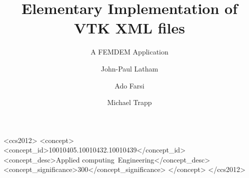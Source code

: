 \documentclass[format=acmtog,12pt,screen=true,review=false,natbib=false,]{acmart}
\title[Elementary Implementation of VTK files in C]{Elementary Implementation of VTK XML files}
\subtitle{A FEMDEM Application}
\author{John-Paul Latham}
\author{Ado Farsi}
\author{Michael Trapp}
\begin{document}


\begin{CCSXML}
<ccs2012>
<concept>
<concept_id>10010405.10010432.10010439</concept_id>
<concept_desc>Applied computing~Engineering</concept_desc>
<concept_significance>300</concept_significance>
</concept>
</ccs2012>
\end{CCSXML}



\maketitle















\medskip
\printbibliography
\balance


\end{document}
